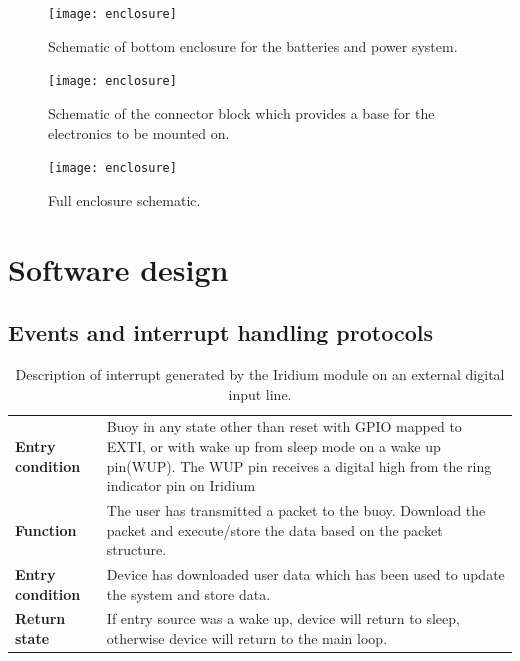\begin{figure}[H]
	\centering
	\texttt{[image: enclosure]}
	\caption{Schematic of bottom enclosure for the batteries and power system.}
	\label{fig:bot_schem}
\end{figure}

\begin{figure}[H]
	\centering
	\texttt{[image: enclosure]}
	\caption{Schematic of the connector block which provides a base for the electronics to be mounted on. }
	\label{fig:conblock_schem}
\end{figure}

\begin{figure}[H]
	\centering
	\texttt{[image: enclosure]}
	\caption{Full enclosure schematic.}
	\label{fig:full_schem}
\end{figure}

\chapter{Software design}

\section{Events and interrupt handling protocols} 
\label{sec:evt}

\begin{table}[H]
	\centering
	\caption{Description of interrupt generated by the Iridium module on an external digital input line.}
	\setlength{\extrarowheight}{5pt}
	\begin{tabular}{|>{\raggedright\arraybackslash}m{}|>{\raggedright\arraybackslash}m{}|}
		\hline
		\multicolumn{2}{|l|}{\textbf{Ring Indicator}} \\
		\hline
		\textbf{Entry condition}  &  Buoy in any state other than reset with GPIO mapped to EXTI, or with wake up from sleep mode on a wake up pin(WUP). The WUP pin receives a digital high from the ring indicator pin on Iridium\\
		\hline
		\textbf{Function} &  The user has transmitted a packet to the buoy. Download the packet and execute/store the data based on the packet structure.\\
		\hline
		\textbf{Entry condition} & Device has downloaded user data which has been used to update the system and store data.\\
		\hline
		\textbf{Return state}& If entry source was a wake up, device will return to sleep, otherwise device will return to the main loop.\\
		\hline
	\end{tabular}
	
	\label{tab:Int_desc_RI}
\end{table}


